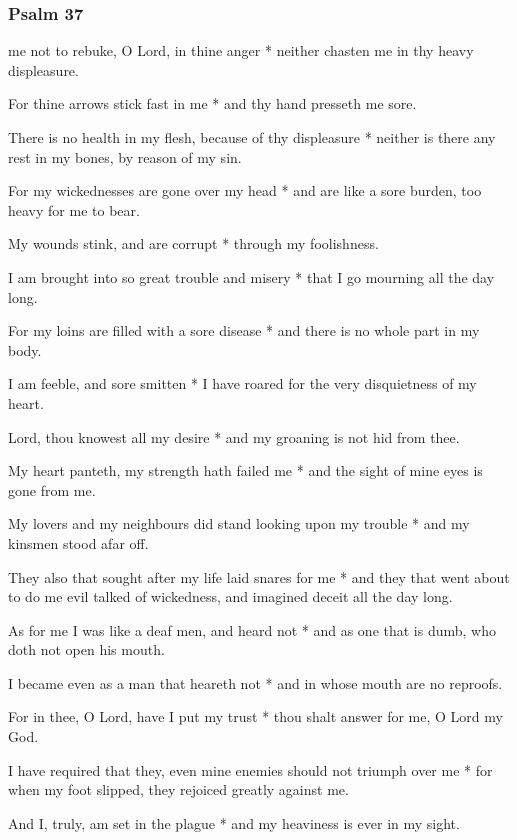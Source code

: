 \subsubsection{Psalm 37}


 me not to rebuke, O Lord, in thine anger * neither chasten me in thy heavy displeasure.

For thine arrows stick fast in me * and thy hand presseth me sore.

There is no health in my flesh, because of thy displeasure * neither is there any rest in my bones, by reason of my sin.

For my wickednesses are gone over my head * and are like a sore burden, too heavy for me to bear.

My wounds stink, and are corrupt * through my foolishness.

I am brought into so great trouble and misery * that I go mourning all the day long.

For my loins are filled with a sore disease * and there is no whole part in my body.

I am feeble, and sore smitten * I have roared for the very disquietness of my heart.

Lord, thou knowest all my desire * and my groaning is not hid from thee.

My heart panteth, my strength hath failed me * and the sight of mine eyes is gone from me.

My lovers and my neighbours did stand looking upon my trouble * and my kinsmen stood afar off.

They also that sought after my life laid snares for me * and they that went about to do me evil talked of wickedness, and imagined deceit all the day long.

As for me I was like a deaf men, and heard not * and as one that is dumb, who doth not open his mouth.

I became even as a man that heareth not * and in whose mouth are no reproofs.

For in thee, O Lord, have I put my trust * thou shalt answer for me, O Lord my God.

I have required that they, even mine enemies should not triumph over me * for when my foot slipped, they rejoiced greatly against me.

And I, truly, am set in the plague * and my heaviness is ever in my sight.

